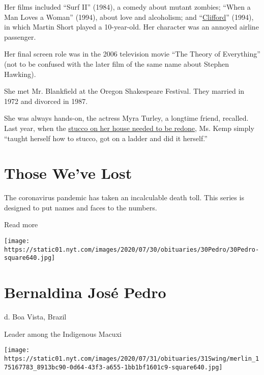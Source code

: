 Her films included ``Surf II'' (1984), a comedy about mutant zombies;
``When a Man Loves a Woman'' (1994), about love and alcoholism; and
``\href{https://www.amazon.com/gp/video/detail/amzn1.dv.gti.80a9f7b8-0c08-88ce-659a-3049f235f807?ref_=imdbref_tt_wbr_pvc_hbo\&tag=imdbtag_tt_wbr_pvc_hbo-20}{Clifford}''
(1994), in which Martin Short played a 10-year-old. Her character was an
annoyed airline passenger.

Her final screen role was in the 2006 television movie ``The Theory of
Everything'' (not to be confused with the later film of the same name
about Stephen Hawking).

She met Mr. Blankfield at the Oregon Shakespeare Festival. They married
in 1972 and divorced in 1987.

She was always hands-on, the actress Myra Turley, a longtime friend,
recalled. Last year, when the
\href{https://www.youtube.com/watch?v=XnuznRkJtow}{stucco on her house
needed to be redone}, Ms. Kemp simply ``taught herself how to stucco,
got on a ladder and did it herself.''

\href{https://www.nytimes.com/interactive/2020/obituaries/people-died-coronavirus-obituaries.html?action=click\&pgtype=Article\&state=default\&region=BELOW_MAIN_CONTENT\&context=covid_obits_promo}{}

\hypertarget{those-weve-lost}{%
\section{Those We've Lost}\label{those-weve-lost}}

The coronavirus pandemic has taken an incalculable death toll. This
series is designed to put names and faces to the numbers.

Read more

\texttt{[image: https://static01.nyt.com/images/2020/07/30/obituaries/30Pedro/30Pedro-square640.jpg]}

\hypertarget{bernaldina-josuxe9-pedro}{%
\section{Bernaldina José Pedro}\label{bernaldina-josuxe9-pedro}}

d. Boa Vista, Brazil

Leader among the Indigenous Macuxi

\texttt{[image: https://static01.nyt.com/images/2020/07/31/obituaries/31Swing/merlin\_175167783\_8913bc90-0d64-43f3-a655-1bb1bf1601c9-square640.jpg]}

